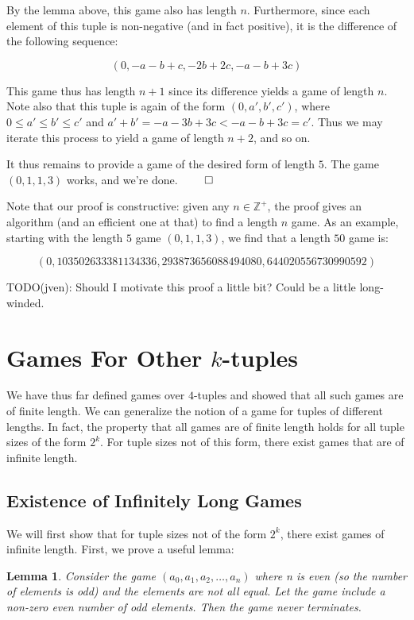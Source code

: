 \documentclass[12pt]{amsart}
\newtheorem{lemma}[theorem]{Lemma}
\newcommand{\zp}{\mathbb{Z}^+}
\begin{document}
By the lemma above, this game also has length $n$. Furthermore, since each element of this tuple is non-negative (and in fact positive), it is the difference of the following sequence:

$$(0, -a - b + c, -2b + 2c, -a - b + 3c)$$

This game thus has length $n + 1$ since its difference yields a game of length $n$. Note also that this tuple is again of the form $(0, a', b', c')$, where $0\leq a'\leq b'\leq c'$ and $a' + b' = -a - 3b + 3c < -a - b + 3c = c'$. Thus we may iterate this process to yield a game of length $n + 2$, and so on.

It thus remains to provide a game of the desired form of length $5$. The game $(0, 1, 1, 3)$ works, and we're done. $\qed$

Note that our proof is constructive: given any $n\in \zp$, the proof gives an algorithm (and an efficient one at that) to find a length $n$ game. As an example, starting with the length $5$ game $(0, 1, 1, 3)$, we find that a length $50$ game is:

$$(0, 103502633381134336, 293873656088494080, 644020556730990592)$$

TODO(jven): Should I motivate this proof a little bit? Could be a little long-winded.

\section{Games For Other $k$-tuples}

We have thus far defined games over $4$-tuples and showed that all such games are of finite length. We can generalize the notion of a game for tuples of different lengths. In fact, the property that all games are of finite length holds for all tuple sizes of the form $2^k$. For tuple sizes not of this form, there exist games that are of infinite length.

\subsection{Existence of Infinitely Long Games}

We will first show that for tuple sizes not of the form $2^k$, there exist games of infinite length. First, we prove a useful lemma:

\begin{lemma}
Consider the game $(a_0, a_1, a_2, \ldots, a_n)$ where n is even (so the number of elements is odd) and the elements are not all equal. Let the game include a non-zero even number of odd elements. Then the game never terminates.
\label{lem:evenodds}
\end{lemma}
\end{document}
